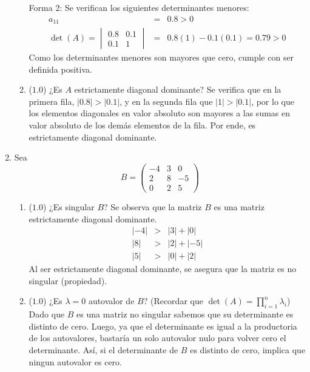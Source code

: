 \documentclass[12pt]{article}
\begin{document}
\begin{enumerate}[leftmargin=*,widest=9]
\begin{enumerate}[label=\alph*]
    Forma 2:
    Se verifican los siguientes determinantes menores:
   \begin{eqnarray*}
   a_{11} &=& 0.8 > 0 \\
   \det(A) = \begin{vmatrix}
    0.8 & 0.1\\ 0.1 & 1
    \end{vmatrix} & = & 0.8(1) -0.1(0.1) = 0.79 > 0
   \end{eqnarray*}
   Como los determinantes menores son mayores que cero, cumple con ser definida positiva.
    \item (\(1.0\)) ¿Es \(A\) estrictamente diagonal dominante?
Se verifica que en la primera fila, \(|0.8| > |0.1|\), y en la segunda fila que \(|1| > |0.1|\), por lo que los elementos diagonales en valor absoluto son mayores a las sumas en valor absoluto de los demás elementos de la fila. Por ende, es estrictamente diagonal dominante.
    \end{enumerate}
    \item Sea
    \[
    B = \begin{pmatrix}
    -4 & 3 & 0\\ 2 & 8 & -5\\ 0 & 2 & 5
    \end{pmatrix}
    \]
    \begin{enumerate}[label=\alph*]
    \item (\(1.0\)) ¿Es singular \(B\)?
    Se observa que la matriz \(B\) es una matriz estrictamente diagonal dominante.
    \begin{eqnarray*}
    |-4| & > & |3|+|0|\\
    |8| & > & |2|+|-5|\\
    |5| & > & |0|+|2|
    \end{eqnarray*}
    Al ser estrictamente diagonal dominante, se asegura que la matriz es no singular (propiedad).
    \item (\(1.0\)) ¿Es \(\lambda = 0\) autovalor de \(B\)? (Recordar que \(\det(A) = \prod\limits_{i=1}^n \lambda_i\))
    Dado que \(B\) es una matriz no singular sabemos que su determinante es distinto de cero. Luego, ya que el determinante es igual a la productoria de los autovalores, bastaría un solo autovalor nulo para volver cero el determinante. Así, si el determinante de \(B\) es distinto de cero, implica que ningun autovalor es cero.

\end{enumerate}
\end{enumerate}
\end{document}
